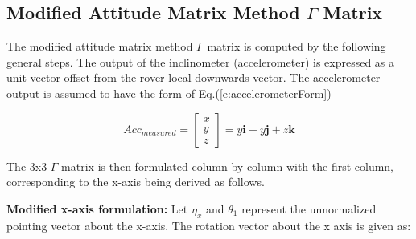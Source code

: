 \documentclass[12pt,a4paper]{book}
\begin{document}
\subsection{Modified Attitude Matrix Method $\Gamma$ Matrix}
The modified attitude matrix method $\Gamma$ matrix is computed by the following general steps.  The output of the inclinometer (accelerometer) is expressed as a unit vector offset from the rover local downwards vector.  The accelerometer output is assumed to have the form of Eq.(\ref{e:accelerometerForm})

\begin{equation}
Acc_{measured} = \begin{bmatrix}
x\\
y\\
z
\end{bmatrix} = y\mathbf{i} + y\mathbf{j} + z\mathbf{k}
\label{e:accelerometerForm}
\end{equation}

The 3x3 $\Gamma$ matrix is then formulated column by column with the first column, corresponding to the x-axis being derived as follows.  

\textbf{Modified x-axis formulation:}
Let $\eta_{x}$ and $\theta_{1}$ represent the unnormalized pointing vector about the x-axis.  The rotation vector about the x axis is given as:
\end{document}
